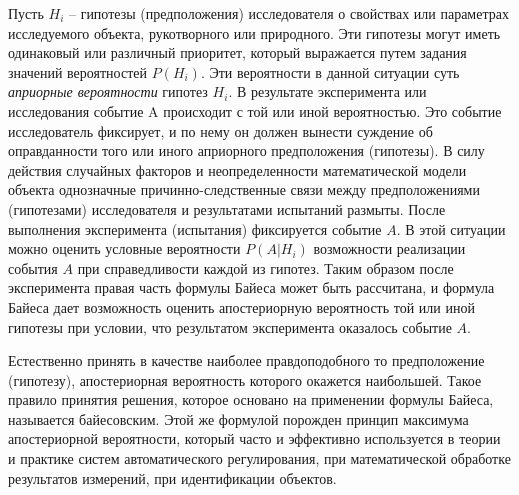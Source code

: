 \documentclass[polytech/stats/exam-2023/stats-exam-2023.tex]{subfiles}
\begin{document}
    Пусть $H_i$ -- гипотезы (предположения) исследователя о свойствах или параметрах исследуемого объекта, рукотворного или природного.
    Эти гипотезы могут иметь одинаковый или различный приоритет, который выражается путем задания значений вероятностей $P(H_i)$.
    Эти вероятности в данной ситуации суть \textit{априорные вероятности} гипотез $H_i$.
    В результате эксперимента или исследования событие A происходит с той или иной вероятностью. Это событие исследователь фиксирует, и по
    нему он должен вынести суждение об оправданности того или иного априорного предположения (гипотезы). В силу действия случайных факторов и
    неопределенности математической модели объекта однозначные причинно-следственные связи между предположениями (гипотезами) 
    исследователя и результатами испытаний размыты. После выполнения эксперимента (испытания) фиксируется событие $A$.
    В этой ситуации можно оценить условные вероятности $P(A | H_i)$ возможности реализации события $A$ при справедливости каждой
    из гипотез. Таким образом после эксперимента правая часть формулы Байеса может быть рассчитана, и формула Байеса
    дает возможность оценить апостериорную вероятность той или иной гипотезы при условии, что результатом эксперимента оказалось событие $A$.

    Естественно принять в качестве наиболее правдоподобного то предположение (гипотезу), апостериорная вероятность которого окажется
    наибольшей. Такое правило принятия решения, которое основано на применении формулы Байеса, называется байесовским. Этой же
    формулой порожден принцип максимума апостериорной вероятности, который часто и эффективно используется в теории и практике
    систем автоматического регулирования, при математической обработке результатов измерений, при идентификации объектов.
    \newpage
\end{document}
